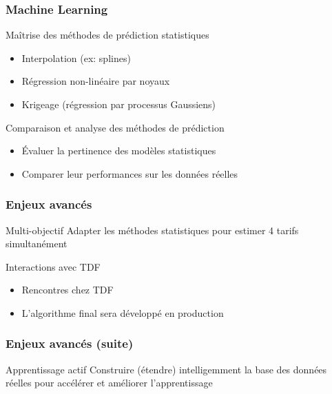 \documentclass{beamer}
\begin{document}
\begin{frame}
\frametitle{Machine Learning}
\begin{block}{Maîtrise des méthodes de prédiction statistiques}
  \begin{itemize}
  \item Interpolation (ex: splines)
  \item Régression non-linéaire par noyaux
  \item Krigeage (régression par processus Gaussiens)
  \end{itemize}
\end{block}
\begin{block}{Comparaison et analyse des méthodes de prédiction}
  \begin{itemize}
  \item Évaluer la pertinence des modèles statistiques
  \item Comparer leur performances sur les données réelles
  \end{itemize}
\end{block}
\end{frame}

\begin{frame}
\frametitle{Enjeux avancés}
\begin{block}{Multi-objectif}
  Adapter les méthodes statistiques pour estimer 4 tarifs simultanément
\end{block}
\begin{block}{Interactions avec TDF}
  \begin{itemize}
  \item Rencontres chez TDF
  \item L'algorithme final sera développé en production
  \end{itemize}
\end{block}
\end{frame}

\begin{frame}
\frametitle{Enjeux avancés (suite)}
\begin{block}{Apprentissage actif}
  Construire (étendre) intelligemment la base des données réelles
  pour accélérer et améliorer l'apprentissage
\end{block}
\end{frame}
\end{document}
